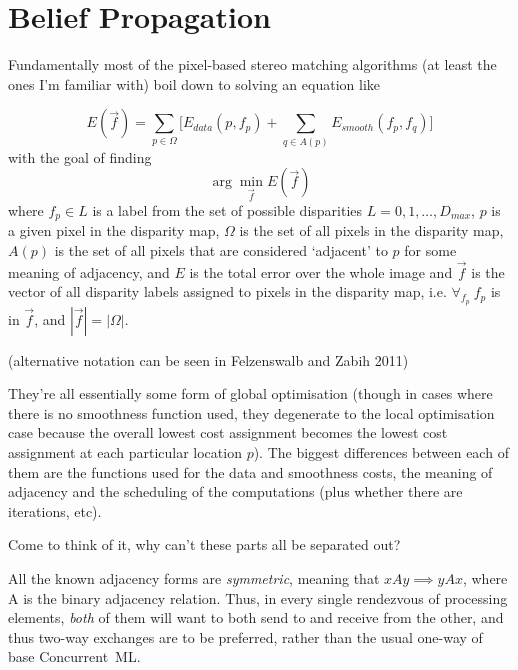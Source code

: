 \chapter{Belief Propagation}

Fundamentally most of the pixel-based stereo matching algorithms (at least the ones I'm familiar with) boil down to solving an equation like

\[ E(\vec{f}) = \sum_{p \in \Omega} \Bigg[ E_{data}(p, f_p) + \sum_{q \in A(p)} E_{smooth}(f_p, f_q)\Bigg] \] with the goal of finding
\[ \arg\min_{\vec{f}} E(\vec{f})\] where \(f_p \in L\) is a label from the set of possible disparities \(L = 0, 1, \ldots, D_{max}\), \(p\) is a given pixel in the disparity map, \(\Omega\) is the set of all pixels in the disparity map, \(A(p)\) is the set of all pixels that are considered `adjacent' to \(p\) for some meaning of adjacency, and \(E\) is the total error over the whole image and \(\vec{f}\) is the vector of all disparity labels assigned to pixels in the disparity map, i.e. \( \forall_{f_p}~f_p\) is in \(\vec{f}\), and \(|\vec{f}| = |\Omega|\).

(alternative notation can be seen in Felzenswalb and Zabih 2011)

They're all essentially some form of global optimisation (though in cases where there is no smoothness function used, they degenerate to the local optimisation case because the overall lowest cost assignment becomes the lowest cost assignment at each particular location \(p\)).  The biggest differences between each of them are the functions used for the data and smoothness costs, the meaning of adjacency and the scheduling of the computations (plus whether there are iterations, etc).

Come to think of it, why can't these parts all be separated out?

All the known adjacency forms are \emph{symmetric}, meaning that \(x A y \implies y A x\), where A is the binary adjacency relation.  Thus, in every single rendezvous of processing elements, \emph{both} of them will want to both send to and receive from the other, and thus two-way exchanges are to be preferred, rather than the usual one-way of base Concurrent~ML.

